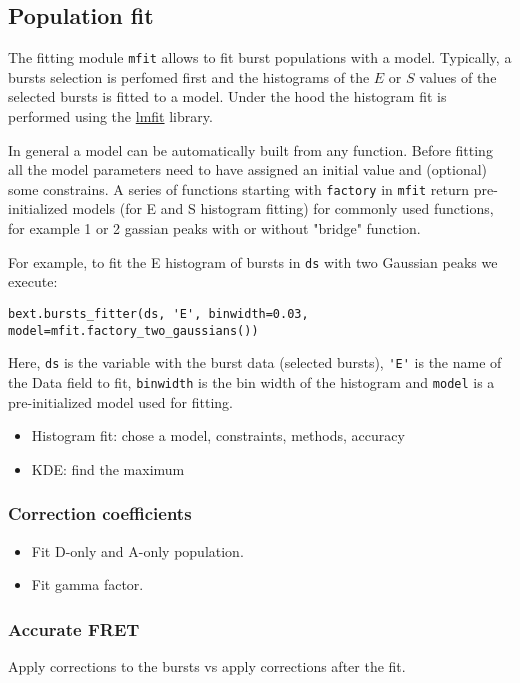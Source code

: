 
\subsection{Population fit}

The fitting module \verb|mfit| allows to fit burst populations with a model. Typically, a bursts selection is perfomed first and the histograms of the $E$ or $S$ values of the selected bursts is fitted to a model. Under the hood the
histogram fit is performed using the \href{http://lmfit.github.io/lmfit-py/}{lmfit} library.

In general a model can be automatically built from any function. Before fitting all the model parameters need to have assigned an initial value and (optional) some constrains. A series of functions starting with \verb|factory| in \verb|mfit| return pre-initialized models (for E and S histogram fitting) for commonly used functions, for example 1 or 2 gassian peaks with or without "bridge" function.

For example, to fit the E histogram of bursts in \verb|ds| with two Gaussian peaks we execute:

\begin{verbatim}
bext.bursts_fitter(ds, 'E', binwidth=0.03, model=mfit.factory_two_gaussians())
\end{verbatim}

Here, \verb|ds| is the variable with the burst data (selected bursts), \verb|'E'| is the name of the Data field to fit, \verb|binwidth| is the bin width of the histogram and \verb|model| is a pre-initialized model used for fitting.

\begin{itemize}
\item Histogram fit: chose a model, constraints, methods, accuracy
\item KDE: find the maximum
\end{itemize}

\subsubsection{Correction coefficients}


\begin{itemize}
\item Fit D-only and A-only population.
\item Fit gamma factor.
\end{itemize}


\subsubsection{Accurate FRET}

Apply corrections to the bursts vs apply corrections after the fit.

